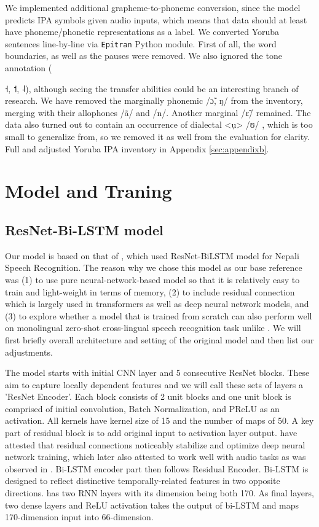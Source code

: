 \documentclass[11pt]{article}
\newcommand{\ipa}[1]{{\ipafont #1}}
\begin{document}
We implemented additional grapheme-to-phoneme conversion, since the model predicts IPA symbols given audio inputs, which means that data should at least have phoneme/phonetic representations as a label. We converted Yoruba sentences line-by-line via \texttt{Epitran} Python module. First of all, the word boundaries, as well as the pauses were removed. We also ignored the tone annotation ({\ipa{˧}, \ipa{˦}, \ipa{˨}), although seeing the transfer abilities could be an interesting branch of research. We have removed the marginally phonemic \ipa{/ɔ̃}, \ipa{ŋ/} from the inventory, merging with their allophones \ipa{/ã/} and \ipa{/n/}. \cite{Przezdziecki2005} Another marginal \ipa{/ɛ̃/} remained. The data also turned out to contain an occurrence of dialectal \ipa{<ụ> /ʊ/} \citet{AllenPulleyblankAjiboye2013}, which is too small to generalize from, so we removed it as well from the evaluation for clarity. Full and adjusted Yoruba IPA inventory in Appendix \ref{sec:appendixb}.

\section{Model and Traning}
\subsection{ResNet-Bi-LSTM model}
Our model is based on that of \cite{dhakal2022automatic}, which used ResNet-BiLSTM model for Nepali Speech Recognition. The reason why we chose this model as our base reference was (1) to use pure neural-network-based model so that it is relatively easy to train and light-weight in terms of memory, (2) to include residual connection which is largely used in transformers as well as deep neural network models, and (3) to explore whether a model that is trained from scratch can also perform well on monolingual zero-shot cross-lingual speech recognition task unlike \cite{xu2021}. We will first briefly overall architecture and setting of the original model and then list our adjustments.

The model starts with initial CNN layer and 5 consecutive ResNet blocks. These aim to capture locally dependent features and we will call these sets of layers a 'ResNet Encoder'. Each block consists of 2 unit blocks and one unit block is comprised of initial convolution, Batch Normalization, and PReLU as an activation. All kernels have kernel size of 15 and the number of maps of 50. A key part of residual block is to add original input to activation layer output. \cite{ravanelli2019speakerrecognitionrawwaveform} have attested that residual connections noticeably stabilize and optimize deep neural network training, which later also attested to work well with audio tasks as was observed in \cite{dhakal2022automatic}. Bi-LSTM encoder part then follows Residual Encoder. Bi-LSTM is designed to reflect distinctive temporally-related features in two opposite directions. \cite{dhakal2022automatic} has two RNN layers with its dimension being both 170. As final layers, two dense layers and ReLU activation takes the output of bi-LSTM and maps 170-dimension input into 66-dimension.

}
\end{document}

